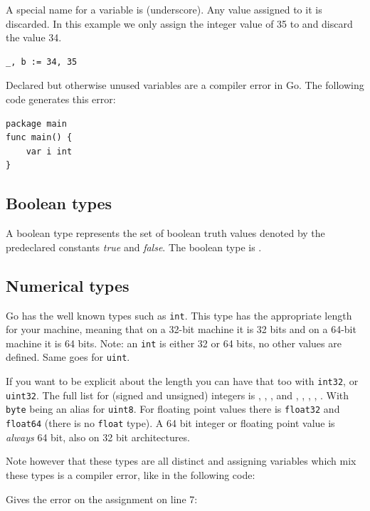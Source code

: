 A special name for a variable is \var{\textbf{\_}} 
(underscore). Any value
assigned to it is discarded. In this example we only assign the integer
value of 35 to  and discard the value 34.
\begin{lstlisting}
_, b := 34, 35
\end{lstlisting}
Declared but otherwise unused variables are a compiler error in Go. The
following code generates this error:

\begin{lstlisting}
package main
func main() { 
    var i int
}
\end{lstlisting}

\subsection{Boolean types}
A boolean type represents the set of boolean truth values denoted by the
predeclared constants \emph{true} and \emph{false}. The boolean type is .

\subsection{Numerical types}
Go has the well known types such as \lstinline{int}. This type
has the appropriate length for your machine,
meaning that on a 32-bit machine it is 32 bits and on
a 64-bit machine it is 64 bits. Note: an \lstinline{int} is
either 32 or 64 bits, no other values are defined. Same goes 
for \lstinline{uint}.

If you want to be explicit about the length you can have
that too with \lstinline{int32}, or \lstinline{uint32}. The full
list for (signed and unsigned) integers is
, , ,  and
, , , , .
With \lstinline{byte} being an
alias for \lstinline{uint8}. For floating point values there is
\lstinline{float32} and \lstinline{float64} (there is no \lstinline{float} type). 
A 64 bit integer or floating point value is \emph{always} 64 bit, also on 32 bit
architectures.

Note however
that these types are all distinct and assigning variables which mix
these types is a compiler error, like in the following code:

Gives the error on the assignment on line 7:


